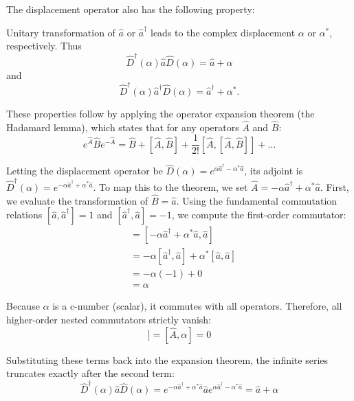 {The displacement operator also has the following property:

{Unitary transformation of $\hat{a}$ or $\hat{a}^{\dagger}$ leads to the complex displacement $\alpha$ or $\alpha^{*}$, respectively. Thus
\begin{equation*} \hat{D}^{\dagger}(\alpha)\hat{a}\hat{D}(\alpha)=\hat{a}+\alpha \end{equation*}
and
\begin{equation*} \hat{D}^{\dagger}(\alpha)\hat{a}^{\dagger}\hat{D}(\alpha)=\hat{a}^{\dagger}+\alpha^{*}. \end{equation*} }

{These properties follow by applying the operator expansion theorem (the Hadamard lemma), which states that for any operators $\hat{A}$ and $\hat{B}$:}
\begin{equation*} e^{\hat{A}}\hat{B}e^{-\hat{A}} = \hat{B} + [\hat{A},\hat{B}] + \frac{1}{2!}[\hat{A},[\hat{A},\hat{B}]] + \dots \end{equation*}

{Letting the displacement operator be $\hat{D}(\alpha) = e^{\alpha\hat{a}^{\dagger}-\alpha^{*}\hat{a}}$, its adjoint is $\hat{D}^{\dagger}(\alpha) = e^{-\alpha\hat{a}^{\dagger}+\alpha^{*}\hat{a}}$. To map this to the theorem, we set $\hat{A} = -\alpha\hat{a}^{\dagger}+\alpha^{*}\hat{a}$. First, we evaluate the transformation of $\hat{B} = \hat{a}$. Using the fundamental commutation relations $[\hat{a},\hat{a}^{\dagger}]=1$ and $[\hat{a}^{\dagger},\hat{a}]=-1$, we compute the first-order commutator:}
\begin{align*}
[\hat{A},\hat{a}] &= [-\alpha\hat{a}^{\dagger}+\alpha^{*}\hat{a}, \hat{a}] \\
&= -\alpha[\hat{a}^{\dagger},\hat{a}] + \alpha^{*}[\hat{a},\hat{a}] \\
&= -\alpha(-1) + 0 \\
&= \alpha
\end{align*}

{Because $\alpha$ is a c-number (scalar), it commutes with all operators. Therefore, all higher-order nested commutators strictly vanish:}
\begin{equation*} [\hat{A},[\hat{A},\hat{a}]] = [\hat{A},\alpha] = 0 \end{equation*}

{Substituting these terms back into the expansion theorem, the infinite series truncates exactly after the second term:}
\begin{equation*} \hat{D}^{\dagger}(\alpha)\hat{a}\hat{D}(\alpha) = e^{-\alpha\hat{a}^{\dagger}+\alpha^{*}\hat{a}}\hat{a}e^{\alpha\hat{a}^{\dagger}-\alpha^{*}\hat{a}} = \hat{a} + \alpha \end{equation*}

}
